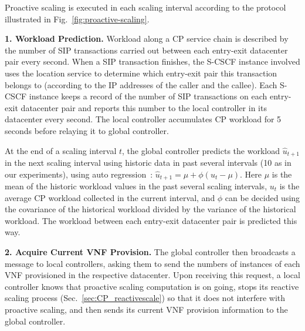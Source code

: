 Proactive scaling is executed in each scaling interval according to the protocol illustrated in Fig.~\ref{fig:proactive-scaling}.

\noindent\textbf{1. Workload Prediction.}
Workload along a CP service chain is described by the number of SIP transactions carried out between each entry-exit datacenter pair every second. When a SIP transaction finishes, the S-CSCF instance involved uses the location service to determine which entry-exit pair this transaction belongs to (according to the IP addresses of the caller and the callee). Each S-CSCF instance keeps a record of the number of SIP transactions on each entry-exit datacenter pair and reports this number to the local controller in its datacenter every second. The local controller accumulates CP workload for 5 seconds before relaying it to global controller.

At the end of a scaling interval $t$, the global controller predicts the workload $\hat{u}_{t+1}$ in the next scaling interval using historic data in past several intervals (10 as in our experiments), using auto regression~\cite{wood2007black}: $\hat{u}_{t+1} = \mu + \phi(u_t-\mu)$.
Here $\mu$ is the mean of the historic workload values in the past several scaling intervals, $u_t$ is the average CP workload collected in the current interval, and $\phi$ can be decided using the covariance of the historical workload divided by the variance of the historical workload. The workload between each entry-exit datacenter pair is predicted this way.

\noindent\textbf{2. Acquire Current VNF Provision.} The global controller then broadcasts a message to local controllers, asking them to send %
 the numbers of instances of each VNF provisioned in the respective datacenter. Upon receiving this request, a local controller knows that proactive scaling computation is on going, stops its reactive scaling process (Sec.~\ref{sec:CP_reactivescale}) so that it does not interfere with proactive scaling, and then sends its current VNF provision information to the global controller.

